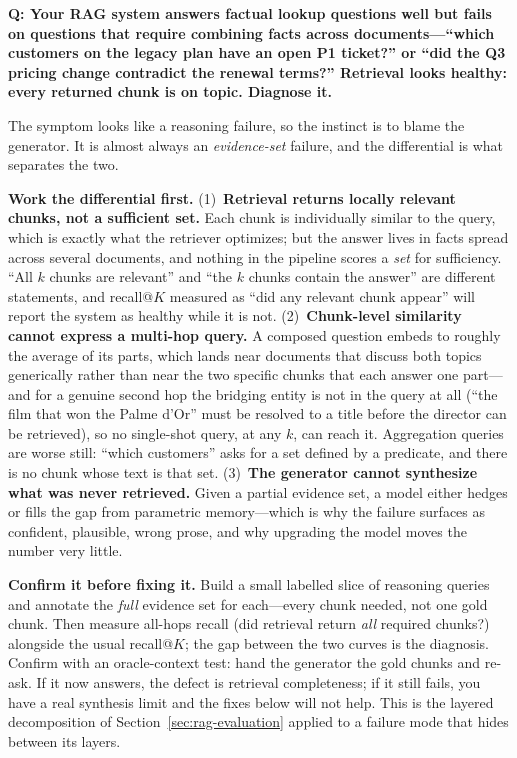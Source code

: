 \begin{interviewq}
\textbf{Q: Your RAG system answers factual lookup questions well but fails on
questions that require combining facts across documents---``which customers on
the legacy plan have an open P1 ticket?'' or ``did the Q3 pricing change
contradict the renewal terms?''  Retrieval looks healthy: every returned chunk
is on topic. Diagnose it.}

 \quad {} \quad \badgefreq{\freqhigh}

\stronganswer
The symptom looks like a reasoning failure, so the instinct is to blame the
generator.  It is almost always an \emph{evidence-set} failure, and the
differential is what separates the two.

\textbf{Work the differential first.}
(1)~\textbf{Retrieval returns locally relevant chunks, not a sufficient set.}
Each chunk is individually similar to the query, which is exactly what the
retriever optimizes; but the answer lives in facts spread across several
documents, and nothing in the pipeline scores a \emph{set} for sufficiency.
``All $k$ chunks are relevant'' and ``the $k$ chunks contain the answer'' are
different statements, and recall@$K$ measured as ``did any relevant chunk
appear'' will report the system as healthy while it is not.
(2)~\textbf{Chunk-level similarity cannot express a multi-hop query.}  A
composed question embeds to roughly the average of its parts, which lands near
documents that discuss both topics generically rather than near the two
specific chunks that each answer one part---and for a genuine second hop the
bridging entity is not in the query at all (``the film that won the Palme d'Or''
must be resolved to a title before the director can be retrieved), so no
single-shot query, at any $k$, can reach it.  Aggregation queries are worse
still: ``which customers'' asks for a set defined by a predicate, and there is
no chunk whose text is that set.
(3)~\textbf{The generator cannot synthesize what was never retrieved.}  Given a
partial evidence set, a model either hedges or fills the gap from parametric
memory---which is why the failure surfaces as confident, plausible, wrong
prose, and why upgrading the model moves the number very little.

\textbf{Confirm it before fixing it.}  Build a small labelled slice of
reasoning queries and annotate the \emph{full} evidence set for each---every
chunk needed, not one gold chunk.  Then measure all-hops recall (did retrieval
return \emph{all} required chunks?) alongside the usual recall@$K$; the gap
between the two curves is the diagnosis.  Confirm with an oracle-context test:
hand the generator the gold chunks and re-ask.  If it now answers, the defect
is retrieval completeness; if it still fails, you have a real synthesis limit
and the fixes below will not help.  This is the layered decomposition of
Section~\ref{sec:rag-evaluation} applied to a failure mode that hides between
its layers.


\end{interviewq}
